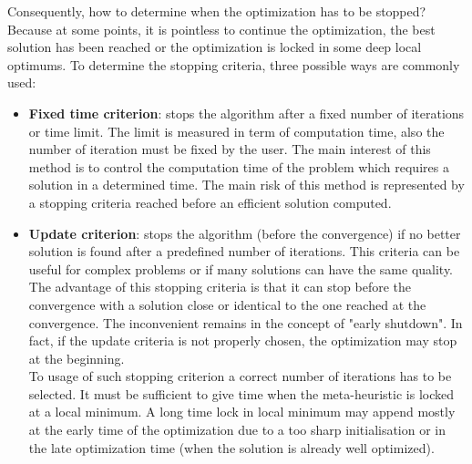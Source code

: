 Consequently, how to determine when the optimization has to be stopped? Because at some points, it is pointless to continue the optimization, the best solution has been reached or the optimization is locked in some deep local optimums.%
 To determine the stopping criteria, three possible ways are commonly used:\\
\begin{itemize}
\item  \textbf{Fixed time criterion}: stops the algorithm after a fixed number of iterations or time limit. The limit is measured in term of computation time, also the number of iteration must be fixed by the user. The main interest of this method is to control the computation time of the problem which requires a solution in a determined time. The main risk of this method is represented by a stopping criteria reached before an efficient solution computed. \\

\item \textbf{Update criterion}: stops the algorithm (before the convergence) if no better solution is found after a predefined number of iterations. This criteria can be useful for complex problems or if many solutions can have the same quality. 
The advantage of this stopping criteria is that it can stop before the convergence with a solution close or identical to the one reached at the convergence. 
The inconvenient remains in the concept of "early shutdown". In fact, if the update criteria is not properly chosen, the optimization  may stop at the beginning.   \\
To usage of such stopping criterion a correct number of iterations has to  be selected. 
It must be sufficient to give time when the meta-heuristic is locked at a local minimum. 
A long time lock in local minimum may append mostly at the early time of the optimization due to a too sharp initialisation or in the late optimization time (when the solution is already well optimized).\\


\end{itemize}
